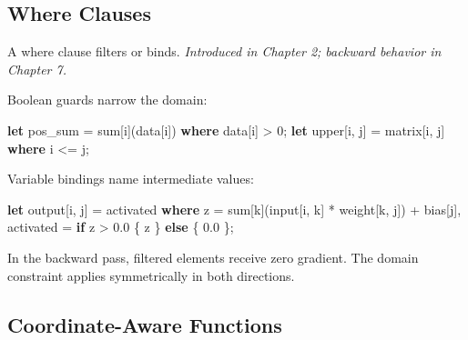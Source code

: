 \documentclass[11pt,titlepage]{article}
\newenvironment{Shaded}{}{}
\newcommand{\DecValTok}[1]{\textcolor[rgb]{0.25,0.63,0.44}{#1}}
\newcommand{\KeywordTok}[1]{\textcolor[rgb]{0.00,0.44,0.13}{\textbf{#1}}}
\newcommand{\NormalTok}[1]{#1}
\newcommand{\OperatorTok}[1]{\textcolor[rgb]{0.40,0.40,0.40}{#1}}
\begin{document}
\vspace{2em}

\hypertarget{where-clauses}{%
\subsection{Where Clauses}\label{where-clauses}}

A where clause filters or binds. \emph{Introduced in Chapter 2; backward
behavior in Chapter 7.}

Boolean guards narrow the domain:

\begin{Shaded}
\begin{Highlighting}[]
\KeywordTok{let}\NormalTok{ pos_sum = sum}\OperatorTok{[}\NormalTok{i}\OperatorTok{]}\NormalTok{(data}\OperatorTok{[}\NormalTok{i}\OperatorTok{]}\NormalTok{) }\KeywordTok{where}\NormalTok{ data}\OperatorTok{[}\NormalTok{i}\OperatorTok{]}\NormalTok{ > }\DecValTok{0}\NormalTok{;}
\KeywordTok{let}\NormalTok{ upper}\OperatorTok{[}\NormalTok{i, j}\OperatorTok{]}\NormalTok{ = matrix}\OperatorTok{[}\NormalTok{i, j}\OperatorTok{]} \KeywordTok{where}\NormalTok{ i <= j;}
\end{Highlighting}
\end{Shaded}

Variable bindings name intermediate values:

\begin{Shaded}
\begin{Highlighting}[]
\KeywordTok{let}\NormalTok{ output}\OperatorTok{[}\NormalTok{i, j}\OperatorTok{]}\NormalTok{ = activated}
    \KeywordTok{where}\NormalTok{ z = sum}\OperatorTok{[}\NormalTok{k}\OperatorTok{]}\NormalTok{(input}\OperatorTok{[}\NormalTok{i, k}\OperatorTok{]}\NormalTok{ * weight}\OperatorTok{[}\NormalTok{k, j}\OperatorTok{]}\NormalTok{) + bias}\OperatorTok{[}\NormalTok{j}\OperatorTok{]}\NormalTok{,}
\NormalTok{          activated = }\KeywordTok{if}\NormalTok{ z > }\DecValTok{0.0} \OperatorTok{\{}\NormalTok{ z }\OperatorTok{\}} \KeywordTok{else} \OperatorTok{\{} \DecValTok{0.0} \OperatorTok{\}}\NormalTok{;}
\end{Highlighting}
\end{Shaded}

In the backward pass, filtered elements receive zero gradient. The
domain constraint applies symmetrically in both directions.

\vspace{2em}

\hypertarget{coordinate-aware-functions-1}{%
\subsection{Coordinate-Aware
Functions}\label{coordinate-aware-functions-1}}
\end{document}
